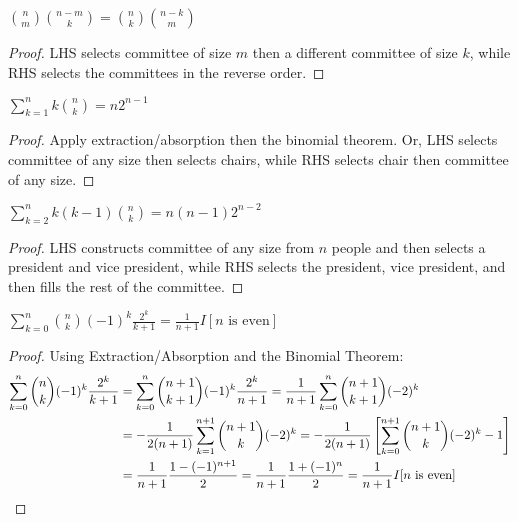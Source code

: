 \documentclass[a4paper]{article}
\begin{document}
\begin{theorem}
$\displaystyle\binom nm\binom{n-m}k=\binom nk\binom{n-k}m$

\begin{hl}
\begin{proof}
LHS selects committee of size $m$ then a different committee of size $k$, while RHS selects the committees in the reverse order.
\end{proof}
\end{hl}
\end{theorem}

\begin{theorem}
$\displaystyle \sum_{k=1}^nk\binom nk=n2^{n-1}$

\begin{hl}
\begin{proof}
Apply extraction/absorption then the binomial theorem. Or, LHS selects committee of any size then selects chairs, while RHS selects chair then committee of any size.
\end{proof}
\end{hl}
\end{theorem}

\begin{theorem}
$\displaystyle\sum_{k=2}^nk(k-1)\binom nk=n(n-1)2^{n-2}$

\begin{hl}
\begin{proof}
LHS constructs committee of any size from $n$ people and then selects a president and vice president, while RHS selects the president, vice president, and then fills the rest of the committee.
\end{proof}
\end{hl}
\end{theorem}

\begin{example}
$\displaystyle\sum_{k=0}^n\binom nk(-1)^k\frac{2^k}{k+1}=\frac1{n+1}I[n\text{ is even}]$

\begin{hl}
\begin{proof}
Using Extraction/Absorption and the Binomial Theorem:
\begin{align*}
\sum_{k=0}^n\binom nk(-1)^k\frac{2^k}{k+1}
&= \sum_{k=0}^n\binom{n+1}{k+1}(-1)^k\frac{2^k}{n+1}
= \frac1{n+1}\sum_{k=0}^n\binom{n+1}{k+1}(-2)^k\\
&= -\frac1{2(n+1)}\sum_{k=1}^{n+1}\binom{n+1}{k}(-2)^k
= -\frac1{2(n+1)}\left[\sum_{k=0}^{n+1}\binom{n+1}{k}(-2)^k-1\right]\\
&= \frac1{n+1}\frac{1-(-1)^{n+1}}2
= \frac1{n+1}\frac{1+(-1)^n}2
= \frac1{n+1}I[n\text{ is even}]\qedhere
\end{align*}
\end{proof}
\end{hl}
\end{example}
\end{document}
